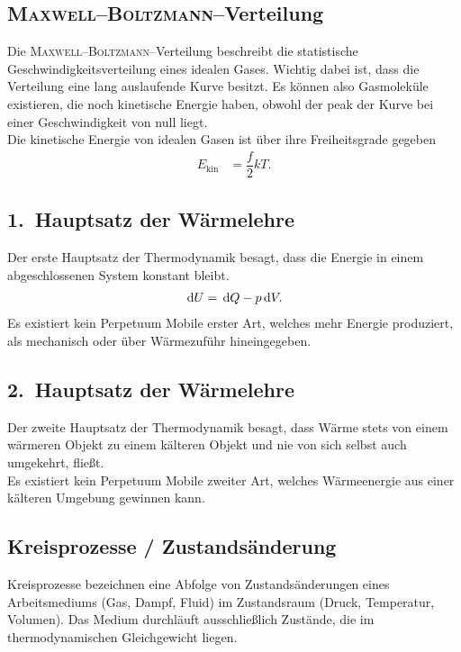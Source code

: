 \subsection{\textsc{Maxwell}--\textsc{Boltzmann}--Verteilung}
Die \textsc{Maxwell--Boltzmann}--Verteilung beschreibt die statistische Geschwindigkeitsverteilung eines idealen Gases. 
Wichtig dabei ist, dass die Verteilung eine lang auslaufende Kurve besitzt.
Es können also Gasmoleküle existieren, die noch kinetische Energie haben, obwohl der peak der Kurve bei einer Geschwindigkeit von null liegt.\\\indent
Die kinetische Energie von idealen Gasen ist über ihre Freiheitsgrade gegeben
\begin{align} 
        E_\text{kin}&=\dfrac{f}{2}kT
.\end{align} 

\subsection{1.\ Hauptsatz der Wärmelehre}
Der erste Hauptsatz der Thermodynamik besagt, dass die Energie in einem abgeschlossenen System konstant bleibt.
\begin{align} 
        \,\text{d} U=\,\text{d} Q-p\,\text{d} V
.\end{align} 
Es existiert kein Perpetuum Mobile erster Art, welches mehr Energie produziert, als mechanisch oder über Wärmezuführ hineingegeben.

\subsection{2.\ Hauptsatz der Wärmelehre}
Der zweite Hauptsatz der Thermodynamik besagt, dass Wärme stets von einem wärmeren Objekt zu einem kälteren Objekt und nie von sich selbst auch umgekehrt, fließt.\\\indent
Es existiert kein Perpetuum Mobile zweiter Art, welches Wärmeenergie aus einer kälteren Umgebung gewinnen kann.

\subsection{Kreisprozesse / Zustandsänderung}
Kreisprozesse bezeichnen eine Abfolge von Zustandsänderungen eines Arbeitsmediums (Gas, Dampf, Fluid) im Zustandsraum (Druck, Temperatur, Volumen).
Das Medium durchläuft ausschließlich Zustände, die im thermodynamischen Gleichgewicht liegen.

